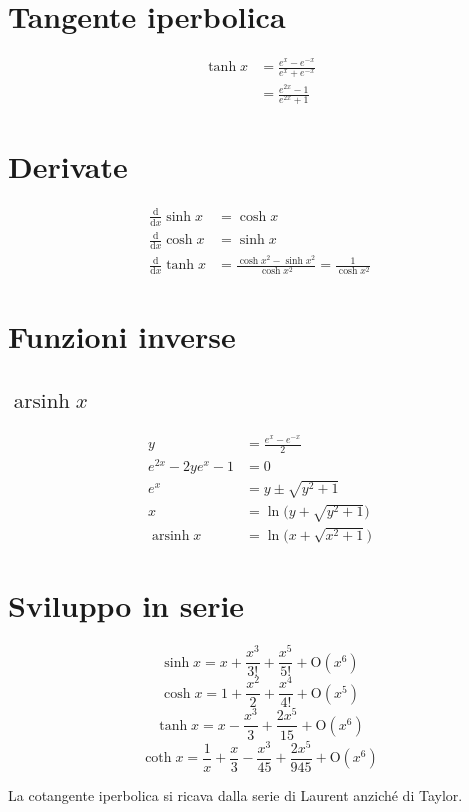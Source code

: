 \documentclass[10pt,a4paper]{article}
\begin{document}
\section{Tangente iperbolica}

\begin{align*}
  \tanh{x} &= \frac{e^x - e^{-x}}{e^x + e^{-x}} \\
  &= \frac{e^{2x}-1}{e^{2x}+1}
\end{align*}

\section{Derivate}

\begin{align*}
  \frac{\mathrm d}{\mathrm d x}\sinh{x} &= \cosh{x} \\
  \frac{\mathrm d}{\mathrm d x}\cosh{x} &= \sinh{x} \\
  \frac{\mathrm d}{\mathrm d x}\tanh{x} &= \frac{\cosh{x}^2-\sinh{x}^2}{\cosh{x}^2}= \frac{1}{\cosh{x}^2}
\end{align*}

\section{Funzioni inverse}

\subsection{$\operatorname{arsinh}{x}$}
\begin{align*}
 y &= \frac{e^x-e^{-x}}{2} \\
e^{2x} -2y e^x -1 &=0 \\
e^x &= y \pm \sqrt{y^2+1} \\
x &= \ln{\big(y + \sqrt{y^2+1}\big)} \\
\operatorname{arsinh}{x} &= \ln{\big(x +  \sqrt{x^2 + 1}\big)}
\end{align*}

\section{Sviluppo in serie}

\begin{equation}
  \label{eq:taylor_sinhx}
  \sinh{x} = x + \frac{x^3}{3!} + \frac{x^5}{5!} + \mathrm{O}(x^6)
\end{equation}
\begin{equation}
  \label{eq:taylor_coshx}
  \cosh{x} = 1 + \frac{x^2}{2} + \frac{x^4}{4!} + \mathrm{O}(x^5)
\end{equation}
\begin{equation}
  \label{eq:taylor_tanhx}
  \tanh{x} = x - \frac{x^3}{3} + \frac{2x^5}{15} + \mathrm{O}(x^6)
\end{equation}
\begin{equation}
  \label{eq:taylor_cotanhx}
  \coth{x} = \frac{1}{x} + \frac{x}{3} - \frac{x^3}{45} + \frac{2x^5}{945} + \mathrm{O}(x^6)
\end{equation}

La cotangente iperbolica si ricava dalla serie di Laurent anziché di Taylor.
\end{document}
